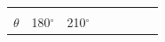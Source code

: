 \begin{center}
\begin{xtabular*}{\mytablewidth}[t]{|p{10\mystarwidth}|p{10\mystarwidth}|p{10\mystarwidth}|p{10\mystarwidth}|p{10\mystarwidth}|p{10\mystarwidth}|p{10\mystarwidth}|p{10\mystarwidth}|}
    
         &
    
    
         &
    
    
         &
    
    
     \tabularnewline{}
    
    
        
                  \begin{math}\theta \end{math}
                 &
    
    
        180\begin{math}{}^{\circ }\end{math} &
    
    
        210\begin{math}{}^{\circ }\end{math} &
    

\end{xtabular*}
\end{center}
